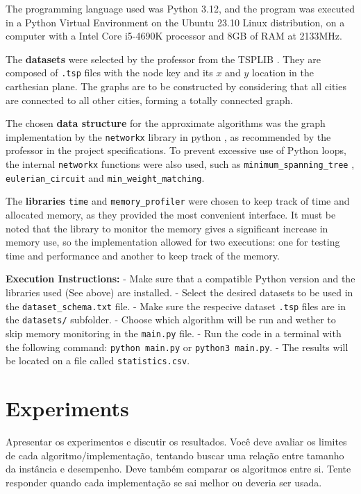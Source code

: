 \documentclass[12pt]{article}
\begin{document}
The programming language used was Python 3.12, and the program was executed 
in a Python Virtual Environment on the Ubuntu 23.10 Linux distribution, on a computer with a 
Intel Core i5-4690K processor and 8GB of RAM at 2133MHz.

The \textbf{datasets} were selected by the professor from the TSPLIB \cite{datasets_lib}. They are 
composed of \texttt{.tsp} files with the node key and its $x$ and $y$ location in the carthesian plane. 
The graphs are to be constructed by considering that all cities are connected to all other cities, forming 
a totally connected graph.

The chosen \textbf{data structure} for the approximate algorithms was the graph implementation 
by the \texttt{networkx} library in python \cite{networkx_docs}, as recommended by 
the professor in the project specifications. To prevent excessive use of Python loops, 
the internal \texttt{networkx} functions were also used, such as \texttt{minimum\_spanning\_tree} , 
\texttt{eulerian\_circuit} and \texttt{min\_weight\_matching}.

The \textbf{libraries} \texttt{time} and \texttt{memory\_profiler} were chosen to keep track of time 
and allocated memory, as they provided the most convenient interface. It must be noted that the library 
to monitor the memory gives a significant increase in memory use, so the implementation allowed for 
two executions: one for testing time and performance and another to keep track of the memory.

\textbf{Execution Instructions:}
- Make sure that a compatible Python version and the libraries used (See above) are installed.
- Select the desired datasets to be used in the \texttt{dataset_schema.txt} file.
- Make sure the respecive dataset \texttt{.tsp} files are in the \texttt{datasets/} subfolder.
- Choose which algorithm will be run and wether to skip memory monitoring in the \texttt{main.py} file.
- Run the code in a terminal with the following command: \texttt{python main.py} or \texttt{python3 main.py}.
- The results will be located on a file called \texttt{statistics.csv}.

\section{Experiments} \label{sec:experiments}
    Apresentar os experimentos e discutir os resultados. Você deve avaliar os
    limites de cada algoritmo/implementação, tentando buscar uma relação entre
    tamanho da instância e desempenho. Deve também comparar os algoritmos
    entre si. Tente responder quando cada implementação se sai melhor ou
    deveria ser usada.
\end{document}
